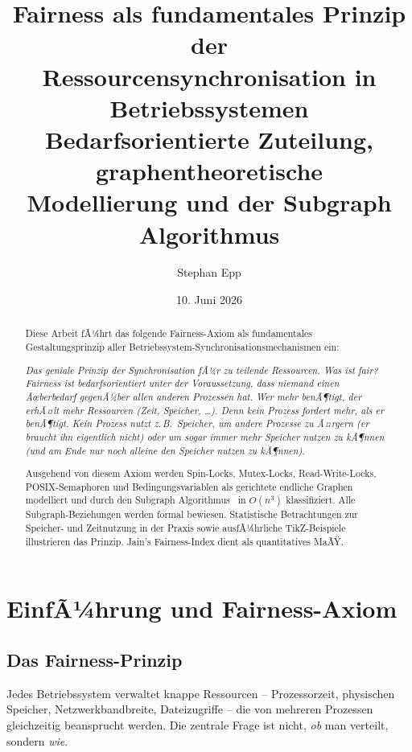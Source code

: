 ﻿\documentclass[a4paper,12pt]{article}
\title{\textbf{Fairness als fundamentales Prinzip der\\
Ressourcensynchronisation in Betriebssystemen}\\[0.4em]
\large Bedarfsorientierte Zuteilung, graphentheoretische\\
Modellierung und der Subgraph Algorithmus}
\author{Stephan Epp}
\date{10. Juni 2026}
\theoremstyle{definition}
\begin{document}
\maketitle

\begin{abstract}
Diese Arbeit fÃ¼hrt das folgende Fairness-Axiom als fundamentales
Gestaltungsprinzip aller Betriebssystem-Synchronisationsmechanismen ein:

\medskip
\textit{Das geniale Prinzip der Synchronisation fÃ¼r zu teilende Ressourcen.
Was ist fair? Fairness ist bedarfsorientiert unter der Voraussetzung,
dass niemand einen Ãœberbedarf gegenÃ¼ber allen anderen Prozessen hat.
Wer mehr benÃ¶tigt, der erhÃ¤lt mehr Ressourcen (Zeit, Speicher, \ldots).
Denn kein Prozess fordert mehr, als er benÃ¶tigt. Kein Prozess nutzt
z.\,B.\ Speicher, um andere Prozesse zu Ã¤rgern (er braucht ihn eigentlich
nicht) oder um sogar immer mehr Speicher nutzen zu kÃ¶nnen (und am Ende
nur noch alleine den Speicher nutzen zu kÃ¶nnen).}

\medskip
Ausgehend von diesem Axiom werden Spin-Locks, Mutex-Locks,
Read-Write-Locks, POSIX-Semaphoren und Bedingungsvariablen als
gerichtete endliche Graphen modelliert und durch den Subgraph
Algorithmus~\cite{epp2026subgraph} in $O(n^3)$ klassifiziert.
Alle Subgraph-Beziehungen werden formal bewiesen.
Statistische Betrachtungen zur Speicher- und Zeitnutzung in der Praxis
sowie ausfÃ¼hrliche TikZ-Beispiele illustrieren das Prinzip.
Jain's Fairness-Index dient als quantitatives MaÃŸ.
\end{abstract}

\tableofcontents
\newpage

\section{EinfÃ¼hrung und Fairness-Axiom}
\label{sec:einf}

\subsection{Das Fairness-Prinzip}

Jedes Betriebssystem verwaltet knappe Ressourcen -- Prozessorzeit,
physischen Speicher, Netzwerkbandbreite, Dateizugriffe -- die von
mehreren Prozessen gleichzeitig beansprucht werden.
Die zentrale Frage ist nicht, \emph{ob} man verteilt, sondern \emph{wie}.
\end{document}
